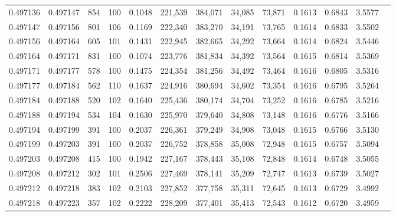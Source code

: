 \begin{tabular}{rrrrrrrrrrrrr}
0.497136 & 0.497147 &   854 & 100 &                                     0.1048 & 221,539 & 384,071 &  34,085 &  73,871 & 0.1613 & 0.6843 & 3.5577 \\
0.497147 & 0.497156 &   801 & 106 &                                     0.1169 & 222,340 & 383,270 &  34,191 &  73,765 & 0.1614 & 0.6833 & 3.5502 \\
0.497156 & 0.497164 &   605 & 101 &                                     0.1431 & 222,945 & 382,665 &  34,292 &  73,664 & 0.1614 & 0.6824 & 3.5446 \\
0.497164 & 0.497171 &   831 & 100 &                                     0.1074 & 223,776 & 381,834 &  34,392 &  73,564 & 0.1615 & 0.6814 & 3.5369 \\
0.497171 & 0.497177 &   578 & 100 &                                     0.1475 & 224,354 & 381,256 &  34,492 &  73,464 & 0.1616 & 0.6805 & 3.5316 \\
0.497177 & 0.497184 &   562 & 110 &                                     0.1637 & 224,916 & 380,694 &  34,602 &  73,354 & 0.1616 & 0.6795 & 3.5264 \\
0.497184 & 0.497188 &   520 & 102 &                                     0.1640 & 225,436 & 380,174 &  34,704 &  73,252 & 0.1616 & 0.6785 & 3.5216 \\
0.497188 & 0.497194 &   534 & 104 &                                     0.1630 & 225,970 & 379,640 &  34,808 &  73,148 & 0.1616 & 0.6776 & 3.5166 \\
0.497194 & 0.497199 &   391 & 100 &                                     0.2037 & 226,361 & 379,249 &  34,908 &  73,048 & 0.1615 & 0.6766 & 3.5130 \\
0.497199 & 0.497203 &   391 & 100 &                                     0.2037 & 226,752 & 378,858 &  35,008 &  72,948 & 0.1615 & 0.6757 & 3.5094 \\
0.497203 & 0.497208 &   415 & 100 &                                     0.1942 & 227,167 & 378,443 &  35,108 &  72,848 & 0.1614 & 0.6748 & 3.5055 \\
0.497208 & 0.497212 &   302 & 101 &                                     0.2506 & 227,469 & 378,141 &  35,209 &  72,747 & 0.1613 & 0.6739 & 3.5027 \\
0.497212 & 0.497218 &   383 & 102 &                                     0.2103 & 227,852 & 377,758 &  35,311 &  72,645 & 0.1613 & 0.6729 & 3.4992 \\
0.497218 & 0.497223 &   357 & 102 &                                     0.2222 & 228,209 & 377,401 &  35,413 &  72,543 & 0.1612 & 0.6720 & 3.4959 \\

\end{tabular}
